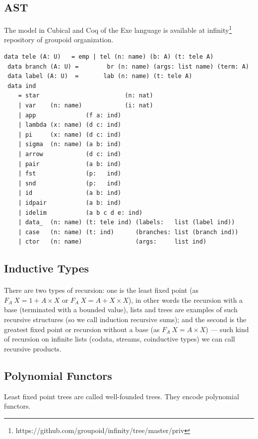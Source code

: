 \documentclass[11pt,oneside]{article}
\begin{document}
\subsection{AST}

The model in Cubical and Coq of the Exe language is available at
infinity\footnote{https://github.com/groupoid/infinity/tree/master/priv}
repository of groupoid organization.

\begin{lstlisting}[mathescape=true]
 data tele (A: U)   = emp | tel (n: name) (b: A) (t: tele A)
 data branch (A: U) =        br (n: name) (args: list name) (term: A)
 data label (A: U)  =       lab (n: name) (t: tele A)
 data ind
    = star                        (n: nat)
    | var    (n: name)            (i: nat)
    | app              (f a: ind)
    | lambda (x: name) (d c: ind)
    | pi     (x: name) (d c: ind)
    | sigma  (n: name) (a b: ind)
    | arrow            (d c: ind)
    | pair             (a b: ind)
    | fst              (p:   ind)
    | snd              (p:   ind)
    | id               (a b: ind)
    | idpair           (a b: ind)
    | idelim           (a b c d e: ind)
    | data_  (n: name) (t: tele ind) (labels:   list (label ind))
    | case   (n: name) (t: ind)      (branches: list (branch ind))
    | ctor   (n: name)               (args:     list ind)
\end{lstlisting}



\newpage
\subsection{Inductive Types}

\paragraph{}
There are two types of recursion: one is the least fixed point (as $F_A\ X = 1 + A\times X$
or $F_A\ X = A + X\times X$), in other words the recursion with a base (terminated with a bounded value),
lists and trees are examples of such recursive structures (so we call induction recursive sums);
and the second is the greatest fixed point or recursion without a base (as $F_A\ X = A\times X $) ---
such kind of recursion on infinite lists (codata, streams, coinductive types) we can call recursive products.\\

\subsection{Polynomial Functors}
Least fixed point trees are called well-founded trees. They encode polynomial functors.\\
\end{document}
